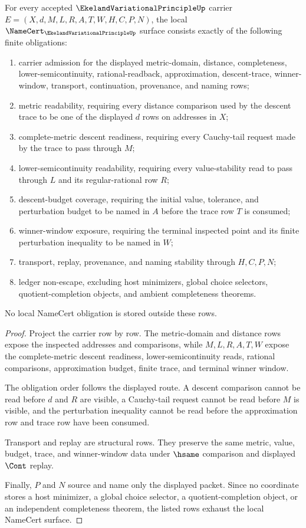 \begin{theorem}
\label{thm:ekeland-variational-principle-namecert-obligations}
For every accepted $\EkelandVariationalPrincipleUp$ carrier $E=(X,d,M,L,R,A,T,W,H,C,P,N)$, the local $\NameCert_{\EkelandVariationalPrincipleUp}$ surface consists exactly of the following finite obligations:
\begin{enumerate}
\item carrier admission for the displayed metric-domain, distance, completeness, lower-semicontinuity, rational-readback, approximation, descent-trace, winner-window, transport, continuation, provenance, and naming rows;
\item metric readability, requiring every distance comparison used by the descent trace to be one of the displayed $d$ rows on addresses in $X$;
\item complete-metric descent readiness, requiring every Cauchy-tail request made by the trace to pass through $M$;
\item lower-semicontinuity readability, requiring every value-stability read to pass through $L$ and its regular-rational row $R$;
\item descent-budget coverage, requiring the initial value, tolerance, and perturbation budget to be named in $A$ before the trace row $T$ is consumed;
\item winner-window exposure, requiring the terminal inspected point and its finite perturbation inequality to be named in $W$;
\item transport, replay, provenance, and naming stability through $H,C,P,N$;
\item ledger non-escape, excluding host minimizers, global choice selectors, quotient-completion objects, and ambient completeness theorems.
\end{enumerate}
No local NameCert obligation is stored outside these rows.
\end{theorem}
\begin{proof}
Project the carrier row by row. The metric-domain and distance rows expose the inspected addresses and comparisons, while $M,L,R,A,T,W$ expose the complete-metric descent readiness, lower-semicontinuity reads, rational comparisons, approximation budget, finite trace, and terminal winner window.

The obligation order follows the displayed route. A descent comparison cannot be read before $d$ and $R$ are visible, a Cauchy-tail request cannot be read before $M$ is visible, and the perturbation inequality cannot be read before the approximation row and trace row have been consumed.

Transport and replay are structural rows. They preserve the same metric, value, budget, trace, and winner-window data under $\hsame$ comparison and displayed $\Cont$ replay.

Finally, $P$ and $N$ source and name only the displayed packet. Since no coordinate stores a host minimizer, a global choice selector, a quotient-completion object, or an independent completeness theorem, the listed rows exhaust the local NameCert surface.
\end{proof}

